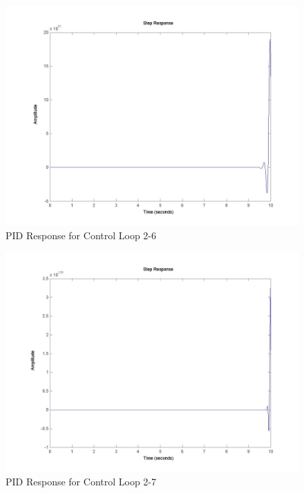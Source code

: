 	\begin{figure}[H]
		\includegraphics[width=\textwidth]{part2-6.jpg}
		\caption{PID Response for Control Loop 2-6}
	\end{figure}
	
	\begin{figure}[H]
		\includegraphics[width=\textwidth]{part2-7.jpg}
		\caption{PID Response for Control Loop 2-7}
	\end{figure}
	
